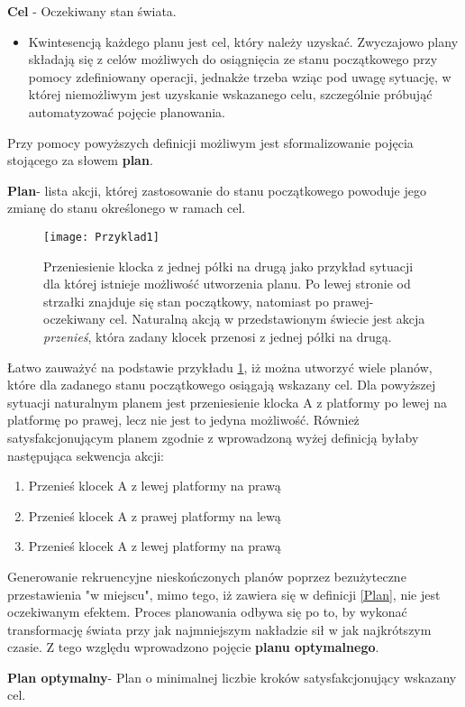     \begin{definition}
    \label{Cel}
        \textbf{Cel} - Oczekiwany stan świata.
    \end{definition}
    \begin{itemize}
        \item Kwintesencją każdego planu jest cel, który należy uzyskać. Zwyczajowo plany składają się z celów możliwych do
        osiągnięcia ze stanu początkowego przy pomocy zdefiniowany operacji, jednakże trzeba wziąc pod uwagę sytuację, w której 
        niemożliwym jest uzyskanie wskazanego celu, szczególnie próbująć automatyzować pojęcie planowania.
    \end{itemize} 
    Przy pomocy powyższych definicji możliwym jest sformalizowanie pojęcia stojącego za słowem \textbf{plan}. 
    \begin{definition}
    \label{Plan}
    \textbf{Plan}- lista akcji, której zastosowanie do stanu początkowego powoduje jego zmianę do stanu określonego w ramach cel. 
    \end{definition}
    
    \begin{figure}[H]
        \texttt{[image: Przyklad1]}
        \centering
        \caption{Przeniesienie klocka z jednej półki na drugą jako przykład sytuacji
        dla której istnieje możliwość utworzenia planu. Po lewej stronie od strzałki znajduje się stan
        początkowy, natomiast po prawej- oczekiwany cel. Naturalną akcją w przedstawionym świecie jest akcja \textit{przenieś}, która
        zadany klocek przenosi z jednej półki na drugą.}
        \label{Przyklad1}
    \end{figure}
    Łatwo zauważyć na podstawie przykładu \ref{Przyklad1}, iż można utworzyć wiele planów, które dla zadanego stanu początkowego 
    osiągają wskazany cel. Dla powyższej sytuacji naturalnym planem jest przeniesienie klocka A z platformy po lewej na platformę po prawej, 
    lecz nie jest to jedyna możliwość. Również satysfakcjonującym planem zgodnie z wprowadzoną wyżej definicją byłaby następująca sekwencja
    akcji:
    \begin{enumerate}
        \item Przenieś klocek A z lewej platformy na prawą
        \item Przenieś klocek A z prawej platformy na lewą
        \item Przenieś klocek A z lewej platformy na prawą
    \end{enumerate}
    Generowanie rekruencyjne nieskończonych planów poprzez bezużyteczne przestawienia "w miejscu", mimo tego, iż zawiera się w definicji \ref{Plan},
    nie jest oczekiwanym efektem. Proces planowania odbywa się po to, by wykonać transformację świata przy jak najmniejszym
    nakładzie sił w jak najkrótszym czasie. Z tego względu wprowadzono pojęcie \textbf{planu optymalnego}.
    \begin{definition}
        \label{PlanOptymalny}
        \textbf{Plan optymalny}- Plan o minimalnej liczbie kroków satysfakcjonujący wskazany cel. 
    \end{definition}
     
